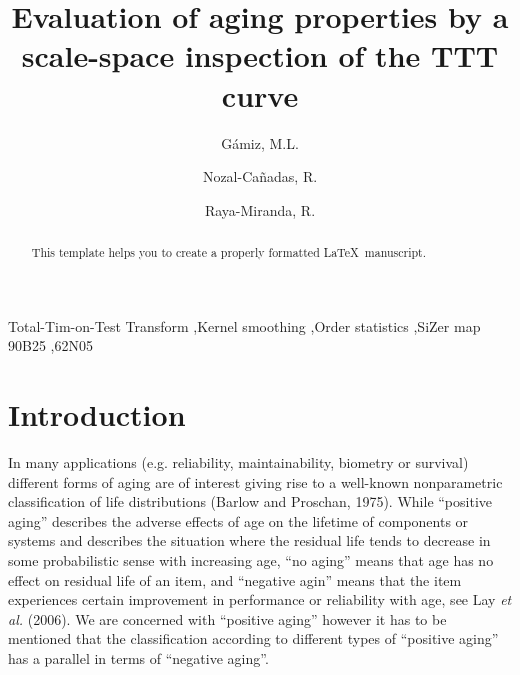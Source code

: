 \documentclass[preprint,12pt]{elsarticle}
\begin{document}
\begin{frontmatter}

\title{Evaluation of aging properties  by a scale-space inspection of the TTT curve}


\author{G\'amiz, M.L.}

\author{Nozal-Ca\~nadas, R.}
\author{ Raya-Miranda, R.}

\address{University of Granada}
%
%


\begin{abstract}
This template helps you to create a properly formatted \LaTeX\ manuscript.
\end{abstract}

\begin{keyword}
Total-Tim-on-Test Transform \sep Kernel smoothing \sep Order statistics \sep SiZer map
\MSC[2010] 90B25 \sep  62N05
\end{keyword}

\end{frontmatter}

\linenumbers

\bigskip

\section{Introduction}
In many applications (e.g. reliability, maintainability, biometry or survival) different forms of aging are of interest giving rise to a well-known nonparametric classification of life distributions (Barlow and Proschan, 1975). While  ``positive aging'' describes the adverse effects of age on the lifetime of components or systems and describes the situation where the residual life tends to decrease in some probabilistic sense with increasing age,  ``no aging'' means that age has no effect on residual life of an item, and  ``negative agin'' means that the item experiences certain improvement in performance or reliability with age, see Lay {\it et al.} (2006). We are concerned with ``positive aging''  however it has to be mentioned that the classification according to different types of ``positive aging'' has a parallel in terms of ``negative aging''.
\end{document}
